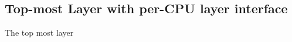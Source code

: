 \subsection{Top-most Layer with per-CPU layer interface}
\label{chapter:certikos:subsec:pbthread}

The top most layer 